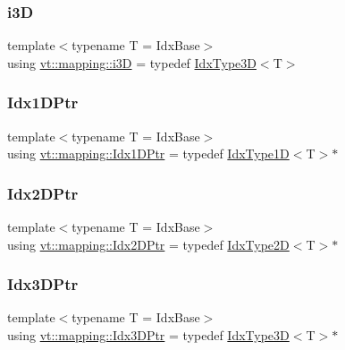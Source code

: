 \subsubsection{\texorpdfstring{i3D}{i3D}}
{\footnotesize\ttfamily template$<$typename T  = Idx\+Base$>$ \\
using \hyperlink{namespacevt_1_1mapping_af435b967b9ed1ccb5ec4effdbd9abd13}{vt\+::mapping\+::i3D} = typedef \hyperlink{namespacevt_a65e4a83c0567ecb7a54b78e9b8e7d7ab}{Idx\+Type3D}$<$T$>$}

\mbox{\label{namespacevt_1_1mapping_a8b576cf2f31069778e4951f64bccafd8}} 
\subsubsection{\texorpdfstring{Idx1\+D\+Ptr}{Idx1DPtr}}
{\footnotesize\ttfamily template$<$typename T  = Idx\+Base$>$ \\
using \hyperlink{namespacevt_1_1mapping_a8b576cf2f31069778e4951f64bccafd8}{vt\+::mapping\+::\+Idx1\+D\+Ptr} = typedef \hyperlink{namespacevt_a36127c6500f2311908c959be653da40e}{Idx\+Type1D}$<$T$>$$\ast$}

\mbox{\label{namespacevt_1_1mapping_a6832cbb1361fe72fd7ec730e7b7773b3}} 
\subsubsection{\texorpdfstring{Idx2\+D\+Ptr}{Idx2DPtr}}
{\footnotesize\ttfamily template$<$typename T  = Idx\+Base$>$ \\
using \hyperlink{namespacevt_1_1mapping_a6832cbb1361fe72fd7ec730e7b7773b3}{vt\+::mapping\+::\+Idx2\+D\+Ptr} = typedef \hyperlink{namespacevt_ab0fbc5ddf69b5aa0ed6a8d1658b504eb}{Idx\+Type2D}$<$T$>$$\ast$}

\mbox{\label{namespacevt_1_1mapping_aacc737158b6517f2d760ffc8d1b5abca}} 
\subsubsection{\texorpdfstring{Idx3\+D\+Ptr}{Idx3DPtr}}
{\footnotesize\ttfamily template$<$typename T  = Idx\+Base$>$ \\
using \hyperlink{namespacevt_1_1mapping_aacc737158b6517f2d760ffc8d1b5abca}{vt\+::mapping\+::\+Idx3\+D\+Ptr} = typedef \hyperlink{namespacevt_a65e4a83c0567ecb7a54b78e9b8e7d7ab}{Idx\+Type3D}$<$T$>$$\ast$}

